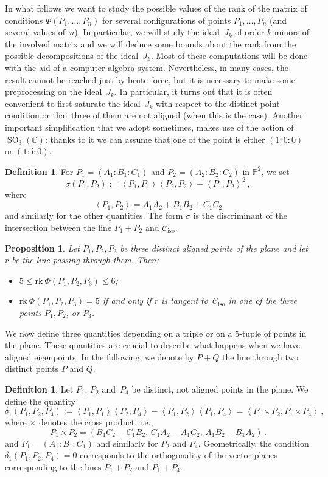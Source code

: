 \documentclass[11pt, a4paper, reqno, captions=tableheading,bibliography=totoc]{scrartcl}
\theoremstyle{plain}
\newtheorem{prop}[lemma]{Proposition}
\theoremstyle{definition}
\newtheorem{definition}[lemma]{Definition}
\newcommand{\C}{\mathbb{C}}
\newcommand{\p}{\mathbb{P}}
\newcommand{\iso}{\mathcal{C}_{\mathrm{iso}}}
\newcommand{\SO}{\operatorname{SO}}
\newcommand{\scl}[2]{\left\langle {#1}, {#2} \right\rangle}
\newcommand{\iii}{\textbf{i}}
\newcommand{\rk}{\ensuremath{\mathrm{rk}}}
\begin{document}
In what follows we want to study the possible values of the rank of the matrix of conditions
$\Phi(P_1, \dots, P_n)$ for several configurations of points $P_1, \dots, P_n$
(and several values of~$n$).
In particular, we will study the ideal~$J_k$ of order $k$ minors of the
involved matrix and we will deduce some bounds about the rank from the possible
decompositions of the ideal~$J_k$. Most of these computations will be done
with the aid of a computer algebra system. Nevertheless, in many cases,
the result cannot be reached just by brute force, but it is necessary to
make some preprocessing on the ideal~$J_k$. In particular, it turns out that
it is often convenient to first saturate the ideal~$J_k$ with respect to
the distinct point condition or that three of them are not aligned (when this is the
case). Another important simplification that we adopt sometimes, makes use
of the action of~$\SO_3(\C)$: thanks to it we can assume that one of
the point is either $(1: 0: 0)$ or $(1: \iii: 0)$.

\begin{definition}
\label{definition:sigma}
For $P_1 = (A_1: B_1: C_1)$ and $P_2 = (A_2: B_2: C_2)$ in $\p^2$, we set
%
\[
  \sigma(P_1, P_2) := \scl{P_1}{P_1} \scl{P_2}{P_2} - \scl{P_1}{P_2}^2 \,,
\]
%
where
%
\[
 \scl{P_1}{P_2} = A_1 A_2 + B_1 B_2 + C_1 C_2
\]
%
and similarly for the other quantities.
The form $\sigma$ is the discriminant of the intersection between the line $P_1+P_2$ and $\iso$.
\end{definition}


\begin{prop}
\label{proposition:three_aligned_ranks}
Let $P_1, P_2, P_3$ be three distinct aligned points of the plane and let
$r$ be the line passing through them. Then:
\begin{itemize}
\item $5 \leq \rk \ \Phi(P_1, P_2, P_3) \leq 6$;
\item
$\rk \ \Phi(P_1, P_2, P_3) = 5$ if and only if $r$ is tangent
to~$\iso$ in one of the three points $P_1, P_2$, or $P_3$.
\end{itemize}
\end{prop}

We now define three quantities depending on a triple or on a $5$-tuple of points in the plane.
These quantities are crucial to describe what happens when we have aligned eigenpoints.
In the following, we denote by $P + Q$ the line through two distinct points $P$ and $Q$.

\begin{definition}
\label{definition:delta1}
 Let $P_1$, $P_2$ and~$P_4$ be distinct, not aligned points in the plane.
 We define the quantity
 \[
  \delta_1(P_1, P_2, P_4) :=
  \scl{P_1}{P_1} \scl{P_2}{P_4} - \scl{P_1}{P_2}\scl{P_1}{P_4}
  =
  \scl{P_1\times P_2}{P_1 \times P_4} \,,
 \]
 where $\times$ denotes the cross product, i.e.,
 \[
  P_1 \times P_2 = (B_1 C_2 - C_1 B_2, \, C_1 A_2 - A_1 C_2, \, A_1 B_2 - B_1 A_2) \,.
 \]
 and $P_1 = (A_1: B_1: C_1)$ and similarly for $P_2$ and $P_4$. Geometrically, the condition $\delta_1(P_1, P_2, P_4) = 0$ corresponds to the orthogonality of the vector planes corresponding to the lines $P_1 + P_2$ and $P_1 + P_4$.
\end{definition}
\end{document}
